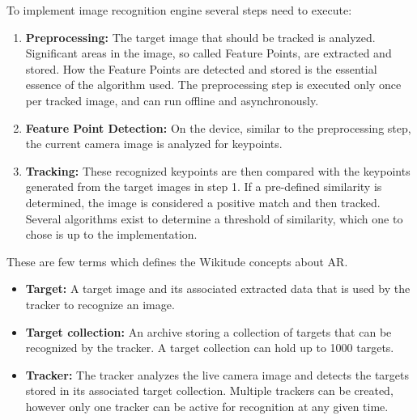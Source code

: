 \documentclass{article}
\begin{document}
\par To implement image recognition engine several steps need to execute: 
\begin{enumerate}
\item \textbf{Preprocessing:} The target image that should be tracked is analyzed. Significant areas in the image, so called Feature Points, are extracted and stored. How the Feature Points are detected and stored is the essential essence of the algorithm used. The preprocessing step is executed only once per tracked image, and can run offline and asynchronously.

\item \textbf{Feature Point Detection:}  On the device, similar to the preprocessing step, the current camera image is analyzed for keypoints. 

\item \textbf{Tracking: } These recognized keypoints are then compared with the keypoints generated from the target images in step 1. If a pre-defined similarity is determined, the image is considered a positive match and then tracked. Several algorithms exist to determine a threshold of similarity, which one to chose is up to the implementation. 
\end{enumerate}
\par These are few terms which defines the Wikitude concepts about AR. 

\begin{itemize}
\item \textbf{Target:}  A target image and its associated extracted data that is used by the tracker to recognize an image. 
\item \textbf{Target collection:}  An archive storing a collection of targets that can be recognized by the tracker. A target collection can hold up to 1000 targets.
\item \textbf{Tracker: }  The tracker analyzes the live camera image and detects the targets stored in its associated target collection. Multiple trackers can be created, however only one tracker can be active for recognition at any given time. 
\end{itemize}


\iffalse
\end{document}
